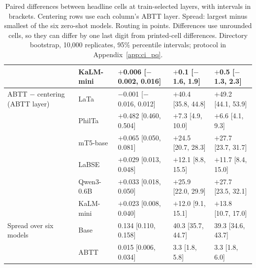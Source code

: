 \begin{table}[t]
\begin{tabular}{lllll}
 & KaLM-mini & $+$0.006 [$-$0.002, 0.016] & $+$0.1 [$-$1.6, 1.9] & $+$0.5 [$-$1.3, 2.3] \\
\midrule
ABTT $-$ centering (ABTT layer) & LaTa & $-$0.001 [$-$0.016, 0.012] & $+$40.4 [35.8, 44.8] & $+$49.2 [44.1, 53.9] \\
 & PhilTa & $+$0.482 [0.460, 0.504] & $+$7.3 [4.9, 10.0] & $+$6.6 [4.1, 9.3] \\
 & mT5-base & $+$0.065 [0.050, 0.081] & $+$24.5 [20.7, 28.3] & $+$27.7 [23.7, 31.7] \\
 & LaBSE & $+$0.029 [0.013, 0.048] & $+$12.1 [8.8, 15.5] & $+$11.7 [8.4, 15.0] \\
 & Qwen3-0.6B & $+$0.033 [0.018, 0.050] & $+$25.9 [22.0, 29.9] & $+$27.7 [23.5, 32.1] \\
 & KaLM-mini & $+$0.023 [0.008, 0.040] & $+$12.0 [9.1, 15.1] & $+$13.8 [10.7, 17.0] \\
\midrule
Spread over six models & Base & 0.134 [0.110, 0.158] & 40.3 [35.7, 44.7] & 39.3 [34.6, 43.7] \\
 & ABTT & 0.015 [0.006, 0.034] & 3.3 [1.8, 5.8] & 3.3 [1.8, 6.0] \\
\bottomrule
\end{tabular}
\caption{Paired differences between headline cells at train-selected layers, with intervals in brackets. Centering rows use each column's ABTT layer. Spread: largest minus smallest of the six zero-shot models. Routing in points. Differences use unrounded cells, so they can differ by one last digit from printed-cell differences. Directory bootstrap, 10{,}000 replicates, 95\% percentile intervals; protocol in Appendix~\ref{app:ci_pq}.}
\label{tab:headline_ci_diffs}
\end{table}

